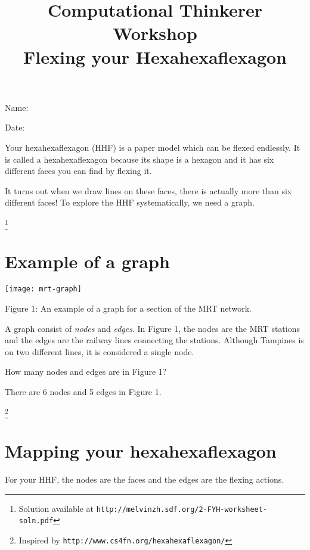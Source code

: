 \documentclass[a4paper,12pt]{article}
\title{Computational Thinkerer Workshop\\
Flexing your Hexahexaflexagon
\vspace{-2cm}}
\date{}
\newcommand\Blank[2][.33\linewidth]{%
  \rule{0pt}{4ex}%
  #2\enspace
  \makebox[#1]{\hrulefill}}
\begin{document}
\maketitle
\begin{flushright}
  \Blank{Name:}

  \Blank{Date:}
\end{flushright}


Your hexahexaflexagon (HHF) is a paper model which can be flexed
endlessly. It is called a hexahexaflexagon because its shape is a hexagon and it
has six different faces you can find by flexing it.

It turns out when we draw lines on these faces, there is actually more than six
different faces! To explore the HHF systematically, we need a graph.

\let\thefootnote\relax\footnote{Solution available at \texttt{http://melvinzh.sdf.org/2-FYH-worksheet-soln.pdf}}

\section*{Example of a graph}
\begin{center}
\texttt{[image: mrt-graph]}

Figure 1: An example of a graph for a section of the MRT network.   
\end{center}

A graph consist of \emph{nodes} and \emph{edges}. In Figure 1, the nodes are the
MRT stations and the edges are the railway lines connecting the stations.
Although Tampines is on two different lines, it is considered a single node.  

\begin{question}[skip-below=3\baselineskip]
How many nodes and edges are in Figure 1?
\end{question}
\begin{solution}
There are 6 nodes and 5 edges in Figure 1. 
\end{solution}

\newpage
\let\thefootnote\relax\footnote{Inspired by \texttt{http://www.cs4fn.org/hexahexaflexagon/}}
\section*{Mapping your hexahexaflexagon}
For your HHF, the nodes are the faces and the edges are the flexing actions.
\end{document}
